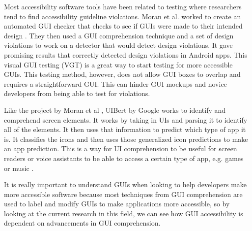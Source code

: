 Most accessibility software tools have been related to testing where researchers tend to find accessibility guideline violations. Moran et al. \cite{Moran18} worked to create an automated GUI checker that checks to see if GUIs were made to their intended design \cite{Moran18}. They then used a GUI comprehension technique and a set of design violations to work on a detector that would detect design violations. It gave promising results that correctly detected design violations in Android apps. This visual GUI testing (VGT) is a great way to start testing for more accessible GUIs. This testing method, however, does not allow GUI boxes to overlap and requires a straightforward GUI. This can hinder GUI mockups and novice developers from being able to test for violations. 

Like the project by Moran et al \cite{Moran18}, UIBert by Google \cite{bai2021uibert} works to identify and comprehend screen elements. It works by taking in UIs and parsing it to identify all of the elements. It then uses that information to predict which type of app it is. It classifies the icons and then uses those generalized icon predictions to make an app prediction. This is a way for UI comprehension to be useful for screen readers or voice assistants to be able to access a certain type of app, e.g. games or music \cite{bai2021uibert}.  

It is really important to understand GUIs when looking to help developers make more accessible software because most techniques from GUI comprehension are used to label and modify GUIs to make applications more accessible, so by looking at the current research in this field, we can see how GUI accessibility is dependent on advancements in GUI comprehension. 



























